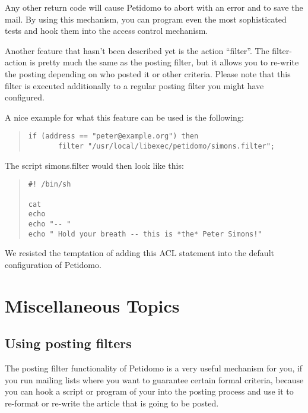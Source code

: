 \documentclass[a4paper,11pt]{scrreprt}
\newcommand{\file}[1]{{\textsf{#1}}}
\begin{document}
Any other return code will cause Petidomo to abort with an error and
to save the mail. By using this mechanism, you can program even the
most sophisticated tests and hook them into the access control
mechanism.

Another feature that hasn't been described yet is the action
``filter''. The filter-action is pretty much the same as the posting
filter, but it allows you to re-write the posting depending on who
posted it or other criteria. Please note that this filter is executed
additionally to a regular posting filter you might have configured.

A nice example for what this feature can be used is the following:
\begin{quote}
\begin{verbatim}
if (address == "peter@example.org") then
       filter "/usr/local/libexec/petidomo/simons.filter";
\end{verbatim}
\end{quote}

The script \file{simons.filter} would then look like this:
\begin{quote}
\begin{verbatim}
#! /bin/sh

cat
echo
echo "-- "
echo " Hold your breath -- this is *the* Peter Simons!"
\end{verbatim}
\end{quote}

We resisted the temptation of adding this ACL statement into the
default configuration of Petidomo.

%
\chapter{Miscellaneous Topics}
\section{Using posting filters}
\label{using posting filters}

The posting filter functionality of Petidomo is a very useful
mechanism for you, if you run mailing lists where you want to
guarantee certain formal criteria, because you can hook a script or
program of your into the posting process and use it to re-format or
re-write the article that is going to be posted.
\end{document}
